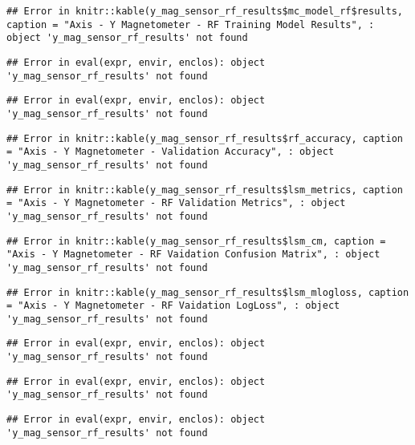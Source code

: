 \documentclass[]{article}
\begin{document}
\begin{verbatim}
## Error in knitr::kable(y_mag_sensor_rf_results$mc_model_rf$results, caption = "Axis - Y Magnetometer - RF Training Model Results", : object 'y_mag_sensor_rf_results' not found
\end{verbatim}

\begin{verbatim}
## Error in eval(expr, envir, enclos): object 'y_mag_sensor_rf_results' not found
\end{verbatim}

\begin{verbatim}
## Error in eval(expr, envir, enclos): object 'y_mag_sensor_rf_results' not found
\end{verbatim}

\begin{verbatim}
## Error in knitr::kable(y_mag_sensor_rf_results$rf_accuracy, caption = "Axis - Y Magnetometer - Validation Accuracy", : object 'y_mag_sensor_rf_results' not found
\end{verbatim}

\begin{verbatim}
## Error in knitr::kable(y_mag_sensor_rf_results$lsm_metrics, caption = "Axis - Y Magnetometer - RF Validation Metrics", : object 'y_mag_sensor_rf_results' not found
\end{verbatim}

\begin{verbatim}
## Error in knitr::kable(y_mag_sensor_rf_results$lsm_cm, caption = "Axis - Y Magnetometer - RF Vaidation Confusion Matrix", : object 'y_mag_sensor_rf_results' not found
\end{verbatim}

\begin{verbatim}
## Error in knitr::kable(y_mag_sensor_rf_results$lsm_mlogloss, caption = "Axis - Y Magnetometer - RF Vaidation LogLoss", : object 'y_mag_sensor_rf_results' not found
\end{verbatim}

\begin{verbatim}
## Error in eval(expr, envir, enclos): object 'y_mag_sensor_rf_results' not found
\end{verbatim}

\begin{verbatim}
## Error in eval(expr, envir, enclos): object 'y_mag_sensor_rf_results' not found
\end{verbatim}

\begin{verbatim}
## Error in eval(expr, envir, enclos): object 'y_mag_sensor_rf_results' not found
\end{verbatim}
\end{document}
